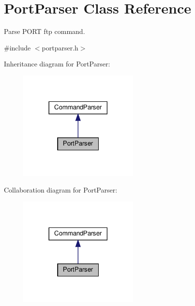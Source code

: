 \hypertarget{classPortParser}{}\section{Port\+Parser Class Reference}
\label{classPortParser}


Parse P\+O\+RT ftp command.  




{\ttfamily \#include $<$portparser.\+h$>$}



Inheritance diagram for Port\+Parser\+:\nopagebreak
\begin{figure}[H]
\begin{center}
\leavevmode
\includegraphics[width=170pt]{dc/de1/classPortParser__inherit__graph}
\end{center}
\end{figure}


Collaboration diagram for Port\+Parser\+:\nopagebreak
\begin{figure}[H]
\begin{center}
\leavevmode
\includegraphics[width=170pt]{db/d1b/classPortParser__coll__graph}
\end{center}
\end{figure}
